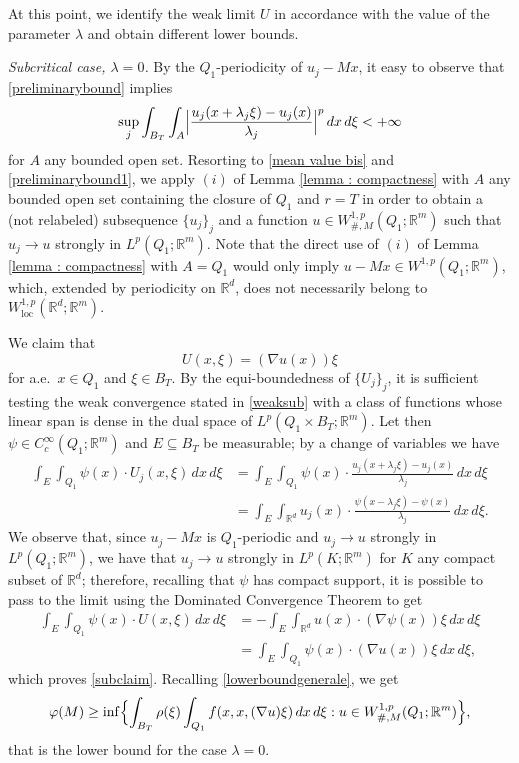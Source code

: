 \documentclass{article}
\theoremstyle{definition}
\newcommand{\f}{\varphi}
\newcommand{\R}{\mathbb{R}}
\begin{document}
At this point, we identify the weak limit $U$ in accordance with the value of the parameter $\lambda$ and obtain different lower bounds.

\medskip

{\em Subcritical case, $\lambda=0$.} By the $Q_1$-periodicity of $u_j-Mx$, it easy to observe that \eqref{preliminarybound} implies  
\begin{equation}\label{preliminarybound1}
 \sup_{j} \int_{B_{T}} \int_{A}\Bigl|\frac{u_j(x+\lambda_j\xi)-u_j(x)}{\lambda_j}\Bigr|^p \, dx\,d\xi<+\infty
\end{equation}
for $A$ any bounded open set. Resorting to \eqref{mean value bis} and \eqref{preliminarybound1}, we apply $(i)$ of Lemma \ref{lemma : compactness} with $A$ any bounded open set containing the closure of $Q_1$ and $r=T$ in order to obtain a (not relabeled) subsequence $\{u_{j}\}_j$ and a function $u\in W_{\#,M}^{1,p}(Q_1;\R^m)$ such that $u_{j}\to u$ strongly in $L^p(Q_1;\R^m)$. Note that the direct use of $(i)$ of Lemma \ref{lemma : compactness} with $A=Q_1$ would only imply $u-Mx\in W^{1,p}(Q_1;\R^m)$, which, extended by periodicity on $\R^d$, does not necessarily belong to $ W^{1,p}_{\text{loc}}(\R^d;\R^m)$. 

We claim that 
\begin{equation}\label{subclaim}
   U(x,\xi)=(\nabla u(x))\xi
\end{equation}
for a.e.\ $x\in Q_1$ and $\xi\in B_T$. By the equi-boundedness of $\{U_j\}_j$, it is sufficient testing the weak convergence stated in \eqref{weaksub} with a class of functions whose linear span is dense in the dual space of $L^p(Q_1\times B_T;\R^m)$. Let then $\psi\in C^\infty_c(Q_1;\R^m)$ and $E\subseteq B_T$ be measurable; by a change of variables we have
\begin{align*}
\int_E\int_{Q_1}\psi(x)\cdot U_j(x,\xi)\, dx \, d\xi & = \int_E\int_{Q_1}\psi(x)\cdot\frac{u_j(x+\lambda_j\xi)-u_j(x)}{\lambda_j}\, dx \, d\xi \\ 
& = \int_E \int_{\R^d}u_j(x)\cdot\frac{\psi(x-\lambda_j\xi)-\psi(x)}{\lambda_j}\, dx\, d\xi.
\end{align*}
We observe that, since $u_j-Mx$ is $Q_1$-periodic and $u_j\to u$ strongly in $L^p(Q_1;\R^m)$, we have that $u_j\to u$ strongly in $L^p(K;\R^m)$ for $K$ any compact subset of $\R^d$; therefore, recalling that $\psi$ has compact support, it is possible to pass to the limit using the Dominated Convergence Theorem to get
\begin{align*}
    \int_E\int_{Q_1}\psi(x)\cdot U(x,\xi)\, dx \, d\xi & = -\int_E \int_{\R^d}u(x)\cdot(\nabla \psi(x))\xi\, dx\, d\xi \\
    & = \int_E \int_{Q_1}\psi(x)\cdot(\nabla u(x))\xi\, dx\, d\xi,
\end{align*}
which proves \eqref{subclaim}. Recalling \eqref{lowerboundgenerale}, we get
\begin{equation*}
    \f(M)\geq \inf\Bigl\{ \int_{B_T} \rho(\xi)\int_{Q_1} f(x,x,(\nabla u ) \xi)\, dx\,d\xi : u\in W^{1,p}_{\#,M}(Q_1; \R^m) \Bigr\},
\end{equation*}
that is the lower bound for the case $\lambda=0$.
\end{document}
